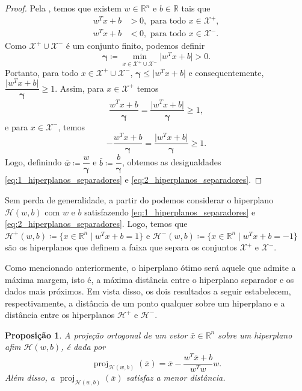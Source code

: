 \documentclass[12pt,a4paper]{scrartcl}
\DeclareMathOperator{\proj}{proj}
\def\Xset{\mathcal{X}}
\def\Hset{\mathcal{H}}
\def\RR{\mathds{R}}
\def\xbar{\bar{x}}
\def\wbar{\bar{w}}
\def\bbar{\bar{b}}
\newtheorem{prop}{Proposição}
\theoremstyle{definition}%
\begin{document}
\begin{proof}
Pela  , temos que existem $w\in \RR^n$ e $b\in \RR$ tais que
\begin{align}
w^{T}x+b &>0, \text{ para todo } x\in \Xset^{+}, \\
w^{T}x+b &<0, \text{ para todo } x\in \Xset^{-}.
\end{align}  
Como $\Xset^{+}\cup \Xset^{-}$ é um conjunto finito, podemos definir
\[ \boldsymbol{\gamma} \coloneqq \min_{x\in \Xset^{+}\cup \Xset^{-}} \vert w^{T}x+b\vert  >0. \]
Portanto, para todo $x\in \Xset^{+}\cup \Xset^{-}$, $\boldsymbol{\gamma} \leq \vert w^{T}x+b\vert$ e consequentemente, $\dfrac{\vert w^{T}x+b\vert }{\boldsymbol{\gamma}} \geq 1$. Assim, para $x\in \Xset^{+}$ temos
\[ \dfrac{w^{T}x+b}{\boldsymbol{\gamma}} = \dfrac{\vert w^{T}x+b\vert }{\boldsymbol{\gamma}} \geq 1, \]
e para $x\in \Xset^{-}$, temos
\[- \dfrac{w^{T}x+b}{\boldsymbol{\gamma}} = \dfrac{\vert w^{T}x+b\vert }{\boldsymbol{\gamma}} \geq 1. \]
Logo, definindo $\wbar \coloneqq \dfrac{w}{\boldsymbol{\gamma}}$ e $\bbar \coloneqq \dfrac{b}{\boldsymbol{\gamma}}$, obtemos as desigualdades \eqref{eq:1_hiperplanos_separadores} e \eqref{eq:2_hiperplanos_separadores}. 

\end{proof}


Sem perda de generalidade, a partir do  podemos considerar o hiperplano $\Hset (w,b)$ com $w$ e $b$ satisfazendo \eqref{eq:1_hiperplanos_separadores} e \eqref{eq:2_hiperplanos_separadores}. Logo, temos que $\Hset^{+} (w,b) \coloneqq \{x\in \RR^n \mid w^{T}x+b= 1\}$ e $\Hset^{-} (w,b) \coloneqq \{x\in \RR^n \mid w^{T}x+b= -1\}$ são os hiperplanos que definem a faixa que separa os conjuntos $\Xset^{+}$ e $\Xset^{-}$.

Como mencionado anteriormente, o hiperplano ótimo será aquele que admite a máxima margem, isto é, a máxima distância entre o hiperplano separador e os dados mais próximos. Em vista disso, os dois resultados a seguir estabelecem, respectivamente, a distância de um ponto qualquer sobre um hiperplano e a distância entre os hiperplanos $\Hset^{+}$ e $\Hset^{-}$.

\begin{prop} \label{prop:projecao_ortogonal_sobre_hiperplano} 
A projeção ortogonal de um vetor $\xbar\in \RR^n$ sobre um hiperplano afim $\Hset(w,b)$, é dada por
\[ \proj_{\Hset (w,b)}(\xbar)= \xbar - \dfrac{w^{T}\xbar+b}{w^{T}w}w. \]
Além disso, a $\proj_{\Hset (w,b)}(\xbar)$ satisfaz a menor distância.
\end{prop}
\end{document}
